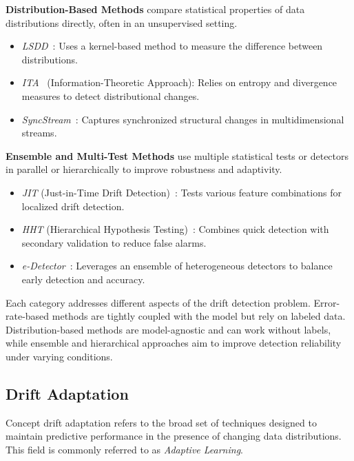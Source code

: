 \textbf{Distribution-Based Methods} compare statistical properties of data distributions directly,
often in an unsupervised setting.

\begin{itemize}
    \item \emph{LSDD}~\cite{lsdd}: Uses a kernel-based method to measure the difference
          between distributions.
    \item \emph{ITA}~\cite{ita} (Information-Theoretic Approach): Relies on entropy and divergence
          measures to detect distributional changes.
    \item \emph{SyncStream}~\cite{syncstream}: Captures synchronized structural changes in multidimensional streams.
\end{itemize}

\textbf{Ensemble and Multi-Test Methods} use multiple statistical tests or detectors in parallel or
hierarchically to improve robustness and adaptivity.

\begin{itemize}
    \item \emph{JIT} (Just-in-Time Drift Detection)~\cite{jit}: Tests various feature combinations
          for localized drift detection.
    \item \emph{HHT} (Hierarchical Hypothesis Testing)~\cite{hht}: Combines quick detection with
          secondary validation to reduce false alarms.
    \item \emph{e-Detector}~\cite{e_detector}: Leverages an ensemble of heterogeneous detectors to
          balance early detection and accuracy.
\end{itemize}

Each category addresses different aspects of the drift detection problem.
Error-rate-based methods are tightly coupled with the model but rely on labeled
data. Distribution-based methods are model-agnostic and can work without
labels, while ensemble and hierarchical approaches aim to improve detection
reliability under varying conditions.

\subsection*{Drift Adaptation}\label{subsec:drift_adaption}

Concept drift adaptation refers to the broad set of techniques designed to
maintain predictive performance in the presence of changing data distributions.
This field is commonly referred to as \emph{Adaptive Learning}.

